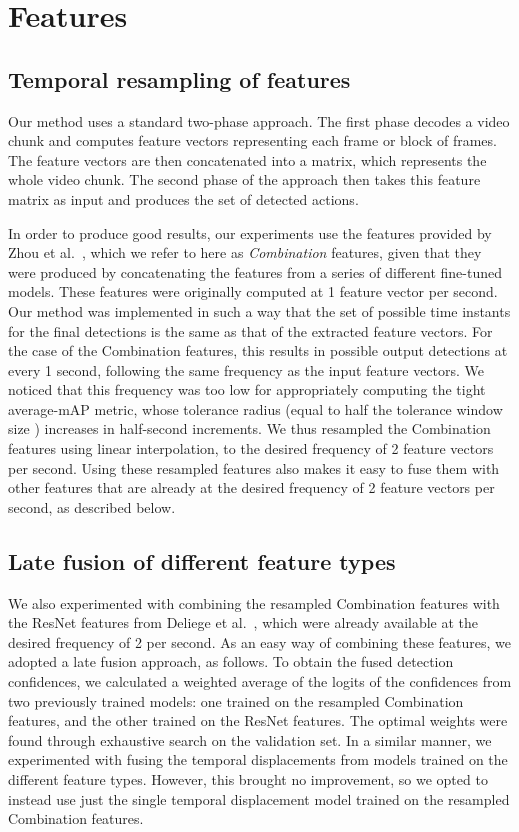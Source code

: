 \documentclass[10pt,twocolumn,letterpaper]{article}
\begin{document}
\section{Features}
\label{sec:features}

\subsection{Temporal resampling of features}
\label{sec:resample}

Our method uses a standard two-phase approach. The first phase decodes a video chunk and computes feature vectors representing each frame or block of frames. The feature vectors are then concatenated into a matrix, which represents the whole video chunk. The second phase of the approach then takes this feature matrix as input and produces the set of detected actions.

In order to produce good results, our experiments use the features provided by Zhou et al.~\cite{zhou2021feature}, which we refer to here as {\it Combination} features, given that they were produced by concatenating the features from a series of different fine-tuned models. These features were originally computed at 1 feature vector per second. Our method was implemented in such a way that the set of possible time instants for the final detections is the same as that of the extracted feature vectors. For the case of the Combination features, this results in possible output detections at every 1 second, following the same frequency as the input feature vectors. We noticed that this frequency was too low for appropriately computing the tight average-mAP metric, whose tolerance radius (equal to half the tolerance window size ) increases in half-second increments. 
We thus resampled the Combination features using linear interpolation, to the desired frequency of 2 feature vectors per second. Using these resampled features also makes it easy to fuse them with other features that are already at the desired frequency of 2 feature vectors per second, as described below.

\subsection{Late fusion of different feature types}



We also experimented with combining the resampled Combination features with the ResNet features from Deliege et al.~\cite{deliege2021soccernet}, which were already available at the desired frequency of 2 per second. As an easy way of combining these features, we adopted a late fusion approach, as follows. To obtain the fused detection confidences, we calculated a weighted average of the logits of the confidences from two previously trained models: one trained on the resampled Combination features, and the other trained on the ResNet features. The optimal weights were found through exhaustive search on the validation set. In a similar manner, we experimented with fusing the temporal displacements from models trained on the different feature types. However, this brought no improvement, so we opted to instead use just the single temporal displacement model trained on the resampled Combination features.
\end{document}

